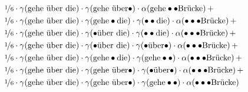 \documentclass[11pt,a4paper]{article}
\begin{document}
\begin{equation}
\begin{split}
    &\nicefrac{1}{6} \cdot \gamma(\text{gehe \"uber die}) \cdot \gamma(\text{gehe \"uber}\bullet) \cdot \alpha(\text{gehe}\bullet\bullet\text{Br\"ucke}) \, + \\
    &\nicefrac{1}{6} \cdot \gamma(\text{gehe \"uber die}) \cdot \gamma(\text{gehe}\bullet\text{die}) \cdot \gamma(\bullet\bullet\text{die}) \cdot \alpha(\bullet\bullet\bullet\text{Br\"ucke}) \, + \\
    &\nicefrac{1}{6} \cdot \gamma(\text{gehe \"uber die}) \cdot \gamma(\bullet\text{\"uber die}) \cdot \gamma(\bullet\bullet\text{die}) \cdot \alpha(\bullet\bullet\bullet\text{Br\"ucke}) \, + \\
    &\nicefrac{1}{6} \cdot \gamma(\text{gehe \"uber die}) \cdot \gamma(\bullet\text{\"uber die}) \cdot \gamma(\bullet\text{\"uber}\bullet) \cdot \alpha(\bullet\bullet\bullet\text{Br\"ucke}) \, + \\
    &\nicefrac{1}{6} \cdot \gamma(\text{gehe \"uber die}) \cdot \gamma(\text{gehe}\bullet\text{die}) \cdot \gamma(\text{gehe}\bullet\bullet) \cdot \alpha(\bullet\bullet\bullet\text{Br\"ucke}) \, + \\
    &\nicefrac{1}{6} \cdot \gamma(\text{gehe \"uber die}) \cdot \gamma(\text{gehe \"uber}\bullet) \cdot \gamma(\bullet\text{\"uber}\bullet) \cdot \alpha(\bullet\bullet\bullet\text{Br\"ucke}) \, + \\
    &\nicefrac{1}{6} \cdot \gamma(\text{gehe \"uber die}) \cdot \gamma(\text{gehe \"uber}\bullet) \cdot \gamma(\text{gehe}\bullet\bullet) \cdot \alpha(\bullet\bullet\bullet\text{Br\"ucke})
  \end{split}
\end{equation}
\end{document}
